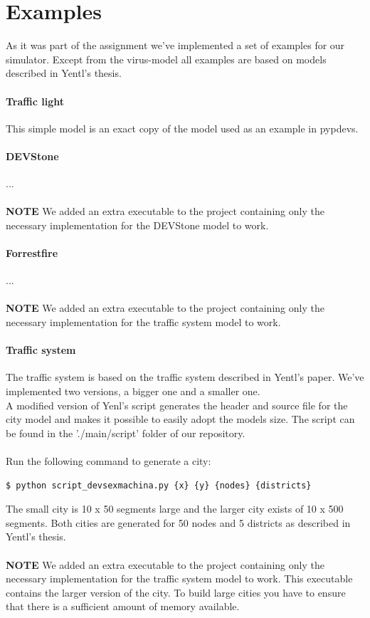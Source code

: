 \documentclass[8pt,a4paper]{report}
\begin{document}
\chapter{Examples}
As it was part of the assignment we've implemented a set of examples for our simulator. Except from the virus-model all examples are based on models described in Yentl's thesis. 

\subsubsection{Traffic light}
This simple model is an exact copy of the model used as an example in pypdevs.

\subsubsection{DEVStone}
...\\
\\
\textbf{NOTE} We added an extra executable to the project containing only the necessary implementation for the DEVStone model to work.

\subsubsection{Forrestfire}
...\\
\\
\textbf{NOTE} We added an extra executable to the project containing only the necessary implementation for the traffic system model to work.

\subsubsection{Traffic system}
The traffic system is based on the traffic system described in Yentl's paper. We've implemented two versions, a bigger one and a smaller one.\\
A modified version of Yenl's script generates the header and source file for the city model and makes it possible to easily adopt the models size. The script can be found in the './main/script' folder of our repository.\\
\\
Run the following command to generate a city:
\begin{Verbatim}[fontsize=\small]
$ python script_devsexmachina.py {x} {y} {nodes} {districts}
\end{Verbatim}
The small city is 10 x 50 segments large and the larger city exists of 10 x 500 segments. Both cities are generated for 50 nodes and 5 districts as described in Yentl's thesis.\\
\\
\textbf{NOTE} We added an extra executable to the project containing only the necessary implementation for the traffic system model to work. This executable contains the larger version of the city. To build large cities you have to ensure that there is a sufficient amount of memory available. 
\end{document}
